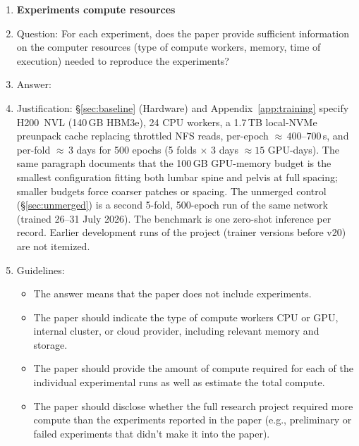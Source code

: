 \begin{enumerate}
\item {\bf Experiments compute resources}
    \item[] Question: For each experiment, does the paper provide sufficient information on the computer resources (type of compute workers, memory, time of execution) needed to reproduce the experiments?
    \item[] Answer: \answerYes{}
    \item[] Justification: \S\ref{sec:baseline} (Hardware) and Appendix~\ref{app:training} specify H200~NVL (140\,GB HBM3e), 24 CPU workers, a 1.7\,TB local-NVMe preunpack cache replacing throttled NFS reads, per-epoch ${\approx}\,400$--$700$\,s, and per-fold ${\approx}\,3$ days for 500 epochs (5 folds $\times$ 3 days $\approx 15$ GPU-days). The same paragraph documents that the 100\,GB GPU-memory budget is the smallest configuration fitting both lumbar spine and pelvis at full spacing; smaller budgets force coarser patches or spacing. The unmerged control (\S\ref{sec:unmerged}) is a second 5-fold, 500-epoch run of the same network (trained 26--31 July 2026). The \sota{} benchmark is one zero-shot inference per record. Earlier development runs of the project (trainer versions before v20) are not itemized.
    \item[] Guidelines:
    \begin{itemize}
        \item The answer \answerNA{} means that the paper does not include experiments.
        \item The paper should indicate the type of compute workers CPU or GPU, internal cluster, or cloud provider, including relevant memory and storage.
        \item The paper should provide the amount of compute required for each of the individual experimental runs as well as estimate the total compute.
        \item The paper should disclose whether the full research project required more compute than the experiments reported in the paper (e.g., preliminary or failed experiments that didn't make it into the paper).
    \end{itemize}


\end{enumerate}
